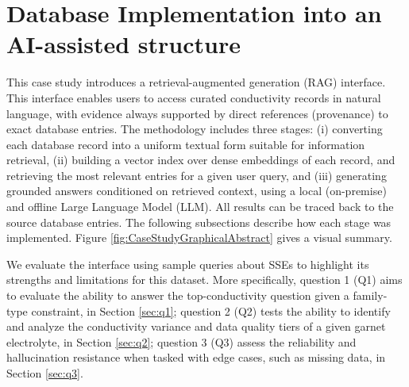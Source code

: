 \documentclass[a4paper,fleqn]{cas-sc}
\begin{document}
\section{Database Implementation into an AI-assisted structure}
This case study introduces a retrieval-augmented generation (RAG) interface. This interface enables users to access curated conductivity records in natural language, with evidence always supported by direct references (provenance) to exact database entries. The methodology includes three stages: (i) converting each database record into a uniform textual form suitable for information retrieval, (ii) building a vector index over dense embeddings of each record, and retrieving the most relevant entries for a given user query, and (iii) generating grounded answers conditioned on retrieved context, using a local (on-premise) and offline Large Language Model (LLM). All results can be traced back to the source database entries. The following subsections describe how each stage was implemented. Figure \ref{fig:CaseStudyGraphicalAbstract} gives a visual summary. 



We evaluate the interface using sample queries about SSEs to highlight its strengths and limitations for this dataset. More specifically, question 1 (Q1) aims to evaluate the ability to answer the top-conductivity question given a family-type constraint, in Section \ref{sec:q1}; question 2 (Q2) tests the ability to identify and analyze the conductivity variance and data quality tiers of a given garnet electrolyte, in Section \ref{sec:q2}; question 3 (Q3) assess the reliability and hallucination resistance when tasked with edge cases, such as missing data, in Section \ref{sec:q3}.


\end{document}
